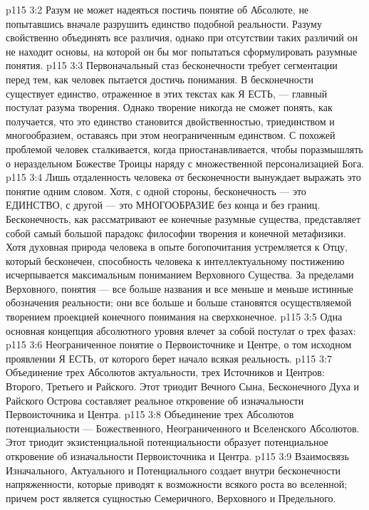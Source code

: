\vs p115 3:2 Разум не может надеяться постичь понятие об Абсолюте, не попытавшись вначале разрушить единство подобной реальности. Разуму свойственно объединять все различия, однако при отсутствии таких различий он не находит основы, на которой он бы мог попытаться сформулировать разумные понятия.
\vs p115 3:3 Первоначальный стаз бесконечности требует сегментации перед тем, как человек пытается достичь понимания. В бесконечности существует единство, отраженное в этих текстах как Я ЕСТЬ, --- главный постулат разума творения. Однако творение никогда не сможет понять, как получается, что это единство становится двойственностью, триединством и многообразием, оставаясь при этом неограниченным единством. С похожей проблемой человек сталкивается, когда приостанавливается, чтобы поразмышлять о нераздельном Божестве Троицы наряду с множественной персонализацией Бога.
\vs p115 3:4 Лишь отдаленность человека от бесконечности вынуждает выражать это понятие одним словом. Хотя, с одной стороны, бесконечность --- это ЕДИНСТВО, с другой --- это МНОГООБРАЗИЕ без конца и без границ. Бесконечность, как рассматривают ее конечные разумные существа, представляет собой самый большой парадокс философии творения и конечной метафизики. Хотя духовная природа человека в опыте богопочитания устремляется к Отцу, который бесконечен, способность человека к интеллектуальному постижению исчерпывается максимальным пониманием Верховного Существа. За пределами Верховного, понятия --- все больше названия и все меньше и меньше истинные обозначения реальности; они все больше и больше становятся осуществляемой творением проекцией конечного понимания на сверхконечное.
\vs p115 3:5 \pc Одна основная концепция абсолютного уровня влечет за собой постулат о трех фазах:
\vs p115 3:6 \bibnobreakspace {} Неограниченное понятие о Первоисточнике и Центре, о том исходном проявлении Я ЕСТЬ, от которого берет начало всякая реальность.
\vs p115 3:7 \pc {}\bibnobreakspace {} Объединение трех Абсолютов актуальности, трех Источников и Центров: Второго, Третьего и Райского. Этот триодит Вечного Сына, Бесконечного Духа и Райского Острова составляет реальное откровение об изначальности Первоисточника и Центра.
\vs p115 3:8 \pc {}\bibnobreakspace {} Объединение трех Абсолютов потенциальности --- Божественного, Неограниченного и Вселенского Абсолютов. Этот триодит экзистенциальной потенциальности образует потенциальное откровение об изначальности Первоисточника и Центра.
\vs p115 3:9 \pc Взаимосвязь Изначального, Актуального и Потенциального создает внутри бесконечности напряженности, которые приводят к возможности всякого роста во вселенной; причем рост является сущностью Семеричного, Верховного и Предельного.
